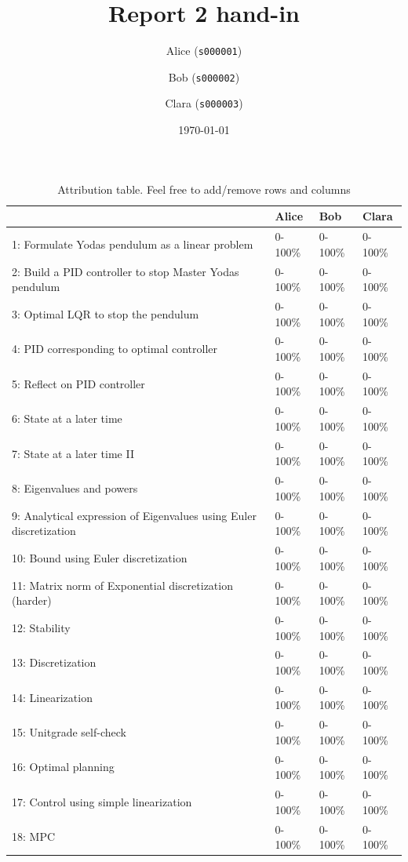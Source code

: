 \documentclass[12pt,twoside]{article}
\title{ Report 2 hand-in }
\date{ \today }
\author{Alice (\texttt{s000001})\and  Bob (\texttt{s000002})\and Clara (\texttt{s000003}) }
\begin{document}
\maketitle

\begin{table}[ht!]
\caption{Attribution table. Feel free to add/remove rows and columns}
\begin{tabular}{llll}
\toprule
                                                                    & Alice   & Bob    & Clara   \\
\midrule
 1: Formulate Yodas pendulum as a linear problem                    & 0-100\%  & 0-100\% & 0-100\%  \\
 2: Build a PID controller to stop Master Yodas pendulum            & 0-100\%  & 0-100\% & 0-100\%  \\
 3: Optimal LQR to stop the pendulum                                & 0-100\%  & 0-100\% & 0-100\%  \\
 4: PID corresponding to optimal controller                         & 0-100\%  & 0-100\% & 0-100\%  \\
 5: Reflect on PID controller                                       & 0-100\%  & 0-100\% & 0-100\%  \\
 6: State at a later time                                           & 0-100\%  & 0-100\% & 0-100\%  \\
 7: State at a later time II                                        & 0-100\%  & 0-100\% & 0-100\%  \\
 8: Eigenvalues and powers                                          & 0-100\%  & 0-100\% & 0-100\%  \\
 9: Analytical expression of Eigenvalues using Euler discretization & 0-100\%  & 0-100\% & 0-100\%  \\
 10: Bound using Euler discretization                               & 0-100\%  & 0-100\% & 0-100\%  \\
 11: Matrix norm of Exponential discretization (harder)             & 0-100\%  & 0-100\% & 0-100\%  \\
 12: Stability                                                      & 0-100\%  & 0-100\% & 0-100\%  \\
 13: Discretization                                                 & 0-100\%  & 0-100\% & 0-100\%  \\
 14: Linearization                                                  & 0-100\%  & 0-100\% & 0-100\%  \\
 15: Unitgrade self-check                                           & 0-100\%  & 0-100\% & 0-100\%  \\
 16: Optimal planning                                               & 0-100\%  & 0-100\% & 0-100\%  \\
 17: Control using simple linearization                             & 0-100\%  & 0-100\% & 0-100\%  \\
 18: MPC                                                            & 0-100\%  & 0-100\% & 0-100\%  \\
\bottomrule
\end{tabular}
\end{table}
\end{document}
